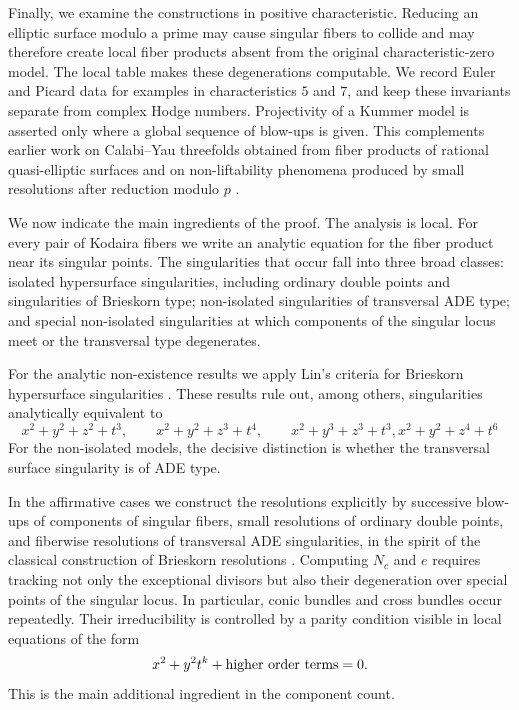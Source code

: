 \documentclass[a4paper]{amsart}
\theoremstyle{plain}
\theoremstyle{definition}
\theoremstyle{remark}
\numberwithin{equation}{section}
\begin{document}
Finally, we examine the constructions in positive characteristic.  Reducing
an elliptic surface modulo a prime may cause singular fibers to collide and
may therefore create local fiber products absent from the original
characteristic-zero model.  The local table makes these degenerations
computable.  We record Euler and Picard data for examples in characteristics
\(5\) and \(7\), and keep these invariants separate from complex Hodge
numbers.  Projectivity of a Kummer model is asserted only where a global
sequence of blow-ups is given.
This complements earlier work on Calabi--Yau threefolds obtained from fiber
products of rational quasi-elliptic surfaces
\cite{HirokadoItoSaito} and on non-liftability phenomena produced by small
resolutions after reduction modulo \(p\) \cite{CynkVanStraten}.

We now indicate the main ingredients of the proof.  The analysis is local.
For every pair of Kodaira fibers we write an analytic equation for the fiber
product near its singular points.  The singularities that occur fall into
three broad classes: isolated hypersurface singularities, including ordinary
double points and singularities of Brieskorn type; non-isolated
singularities of transversal ADE type; and special non-isolated
singularities at which components of the singular locus meet or the
transversal type degenerates.

For the analytic non-existence results we apply Lin's criteria for
Brieskorn hypersurface singularities \cite{Lin}.  These
results rule out, among others, singularities analytically equivalent to
\[
x^2+y^2+z^2+t^3,\qquad
        x^2+y^2+z^3+t^4,\qquad
        x^2+y^3+z^3+t^3,
        x^{2}+y^{2}+z^{4}+t^{6}
\]
For the non-isolated models, the decisive distinction is whether the
transversal surface singularity is of ADE type.

In the affirmative cases we construct the resolutions explicitly by
successive blow-ups of components of singular fibers, small resolutions of
ordinary double points, and fiberwise resolutions of transversal ADE
singularities, in the spirit of the classical construction of Brieskorn
resolutions \cite{Artin}.  Computing \(N_c\) and \(e\) requires tracking not
only the exceptional divisors but also their degeneration over special
points of the singular locus.  In particular, conic bundles and cross
bundles occur repeatedly.  Their irreducibility is controlled by a parity
condition visible in local equations of the form
\[
x^2+y^2t^k+\textup{higher order terms}=0 .
\]
This is the main additional ingredient in the component count.
\end{document}
